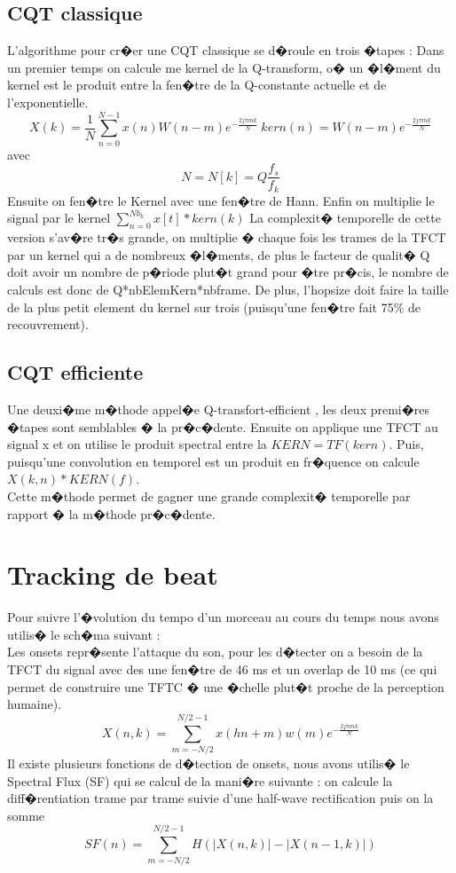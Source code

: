 \documentclass[12pt]{article}
\begin{document}
\subsection{CQT classique}
L'algorithme pour cr�er une CQT classique se d�roule en trois �tapes : 
Dans un premier temps on calcule me kernel de la Q-transform, o� un �l�ment du kernel est le produit entre la fen�tre de la Q-constante actuelle et de l'exponentielle.
\begin{equation*}
X(k) = \frac{1}{N}\sum_{n=0}^{N-1}x(n)W(n-m) e^{- \frac{2j\pi m k}{N}} ~ kern(n) = W(n-m) e^{- \frac{2j\pi m k}{N}}
\end{equation*}
avec 
\begin{equation*}
N= N[k] = Q\frac{f_{s}}{f_{k}}
\end{equation*}
Ensuite on fen�tre le Kernel avec une fen�tre de Hann. 
Enfin on multiplie le signal par le kernel $\sum_{n=0}^{Nb_k}x[t] * kern(k) $
La complexit� temporelle de cette version s'av�re tr�s grande, on multiplie � chaque fois les trames de la TFCT par un kernel qui a de nombreux �l�ments, de plus le facteur de qualit� Q doit avoir un nombre de p�riode plut�t grand pour �tre pr�cis, le nombre de calculs est donc de Q*nbElemKern*nbframe. De plus, l'hopsize doit faire la taille de la plus petit element du kernel sur trois (puisqu'une fen�tre fait 75\% de recouvrement).

\subsection{CQT efficiente}
Une deuxi�me m�thode appel�e Q-transfort-efficient , les deux premi�res �tapes sont semblables � la pr�c�dente. Ensuite on applique une TFCT au signal x et on utilise le produit spectral entre la $KERN = TF(kern)$. Puis, puisqu'une convolution en temporel est un produit en fr�quence on calcule $X(k,n)*KERN(f)$.\\
Cette m�thode permet de gagner une grande complexit� temporelle par rapport � la m�thode pr�c�dente.

\section{Tracking de beat}
Pour suivre l'�volution du tempo d'un morceau au cours du temps nous avons utilis� le sch�ma suivant  :\\

Les onsets repr�sente l'attaque du son, pour les d�tecter on a besoin de la TFCT du signal avec des une fen�tre de 46 ms et un overlap de 10 ms (ce qui permet de construire une TFTC � une �chelle plut�t proche de la perception humaine).
\begin{equation*}
X(n,k) = \sum_{m=-N/2}^{N/2-1}x(hn+m)w(m) e^{- \frac{2j\pi m k}{N}}
\end{equation*}
Il existe plusieurs fonctions de d�tection de onsets, nous avons utilis� le Spectral Flux (SF) qui se calcul de la mani�re suivante :
on calcule la diff�rentiation trame par trame suivie d'une half-wave rectification puis on la somme
\begin{equation*}
SF(n) =  \sum_{m=-N/2}^{N/2-1} H(\mid{X(n,k)|}-\mid{X(n-1,k)|})
\end{equation*}
\end{document}

